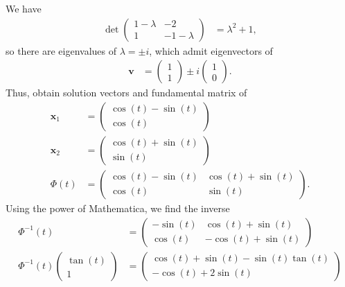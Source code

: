 \documentclass[10pt]{mypackage}
\begin{document}
\begin{solution}[8.3, Problem 28]
  We have
  \begin{align*}
    \det \begin{pmatrix}1-\lambda & -2 \\ 1 & -1-\lambda\end{pmatrix} &= \lambda^2 + 1,
  \end{align*}
  so there are eigenvalues of $\lambda = \pm i$, which admit eigenvectors of
  \begin{align*}
    \mathbf{v} &= \begin{pmatrix}1\\1\end{pmatrix} \pm i\begin{pmatrix}1\\0\end{pmatrix}.
  \end{align*}
  Thus, obtain solution vectors and fundamental matrix of
  \begin{align*}
    \mathbf{x}_1 &= \begin{pmatrix}\cos (t) - \sin (t)\\ \cos (t)\end{pmatrix}\\
    \mathbf{x}_2 &= \begin{pmatrix}\cos (t) + \sin (t) \\ \sin (t)\end{pmatrix}\\
    \Phi(t) &= \begin{pmatrix}\cos(t) - \sin\left( t \right) & \cos\left( t \right) + \sin\left( t \right) \\ \cos\left( t \right) & \sin\left( t \right)\end{pmatrix}.
  \end{align*}
  Using the power of Mathematica, we find the inverse
  \begin{align*}
    \Phi^{-1}\left( t \right) &= \begin{pmatrix}-\sin\left( t \right) & \cos\left( t \right) + \sin\left( t \right) \\ \cos\left( t \right) & -\cos\left( t \right) + \sin\left( t \right)\end{pmatrix}\\
    \Phi^{-1}\left( t \right) \begin{pmatrix}\tan(t) \\ 1\end{pmatrix} &= \begin{pmatrix}\cos(t) + \sin(t) - \sin(t)\tan(t) \\ -\cos(t) + 2\sin(t)\end{pmatrix}\\

\end{align*}
\end{solution}
\end{document}
